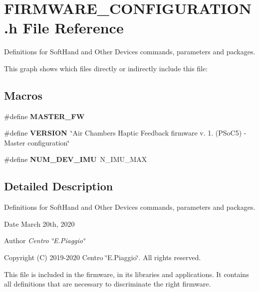 \section{F\+I\+R\+M\+W\+A\+R\+E\+\_\+\+C\+O\+N\+F\+I\+G\+U\+R\+A\+T\+I\+O\+N.\+h File Reference}
\label{_f_i_r_m_w_a_r_e___c_o_n_f_i_g_u_r_a_t_i_o_n_8h}


Definitions for Soft\+Hand and Other Devices commands, parameters and packages.  


This graph shows which files directly or indirectly include this file\+:
\subsection*{Macros}
\begin{DoxyCompactItemize}
\item 
\mbox{\label{_f_i_r_m_w_a_r_e___c_o_n_f_i_g_u_r_a_t_i_o_n_8h_a928d8c902fb82fb70fdbf2988e1c3eeb}} 
\#define {\bfseries M\+A\+S\+T\+E\+R\+\_\+\+FW}
\item 
\mbox{\label{_f_i_r_m_w_a_r_e___c_o_n_f_i_g_u_r_a_t_i_o_n_8h_a1c6d5de492ac61ad29aec7aa9a436bbf}} 
\#define {\bfseries V\+E\+R\+S\+I\+ON}~\char`\"{}Air Chambers Haptic Feedback firmware v. 1. (P\+So\+C5) -\/ Master configuration\char`\"{}
\item 
\mbox{\label{_f_i_r_m_w_a_r_e___c_o_n_f_i_g_u_r_a_t_i_o_n_8h_a44dee30c25c70368dd064f50fcdc5c21}} 
\#define {\bfseries N\+U\+M\+\_\+\+D\+E\+V\+\_\+\+I\+MU}~N\+\_\+\+I\+M\+U\+\_\+\+M\+AX
\end{DoxyCompactItemize}


\subsection{Detailed Description}
Definitions for Soft\+Hand and Other Devices commands, parameters and packages. 

\begin{DoxyDate}{Date}
March 20th, 2020 
\end{DoxyDate}
\begin{DoxyAuthor}{Author}
{\itshape Centro \char`\"{}\+E.\+Piaggio\char`\"{}} 
\end{DoxyAuthor}
\begin{DoxyCopyright}{Copyright}
(C) 2019-\/2020 Centro \char`\"{}\+E.\+Piaggio\char`\"{}. All rights reserved.
\end{DoxyCopyright}
This file is included in the firmware, in its libraries and applications. It contains all definitions that are necessary to discriminate the right firmware. 